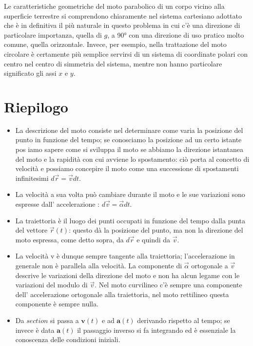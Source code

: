 \documentclass[class=book, crop=false, oneside, 12pt]{standalone}
\begin{document}
Le caratteristiche geometriche del moto parabolico di un corpo vicino alla superficie terrestre si comprendono chiaramente nel sistema cartesiano adottato che è in definitiva il più naturale in questo problema in cui c'è una direzione di particolare importanza, 
quella di \(g\), a 90° con una direzione di uso pratico molto comune, quella orizzontale. 
Invece, per esempio, nella trattazione del moto circolare è certamente più semplice servirsi di un sistema di coordinate polari con centro nel centro di simmetria del sistema, mentre non hanno particolare significato gli assi \(x\) e \(y\).

\section{Riepilogo}

\begin{itemize}
  \item La descrizione del moto consiste nel determinare come varia la posizione del punto in funzione del tempo; se conosciamo la posizione ad un certo istante pos iamo sapere come si sviluppa il moto se abbiamo la direzione istantanea del moto e la rapidità con cui avviene lo spostamento: ciò porta al concetto di velocità e possiamo concepire il moto come una successione di spostamenti infinitesimi \(d \overrightarrow{r}= \overrightarrow{v} dt\).
  \item La velocità a sua volta può cambiare durante il moto e le sue variazioni sono espresse dall' accelerazione : \(d \overrightarrow{v} = \overrightarrow{\alpha} d t\).
  \item La traiettoria è il luogo dei punti occupati in funzione del tempo dalla punta del vettore \(\overrightarrow{r}(t)\): questo dà la posizione del punto, ma non la direzione del moto espressa, come detto sopra, da \(d \overrightarrow{r}\) e quindi da \(\overrightarrow{v}\). 
  \item La velocità v è dunque sempre tangente alla traiettoria; l'accelerazione in generale non è parallela alla velocità. La componente di \(\overrightarrow{\alpha}\) ortogonale a \(\overrightarrow{v}\) descrive le variazioni della direzione del moto e non ha alcun legame con le variazioni del modulo di \(\overrightarrow{v}\). Nel moto curvilineo c'è sempre una componente dell' accelerazione ortogonale alla traiettoria, nel moto rettilineo questa componente è sempre nulla. 
  \item Da \(section\) si passa a \(\boldsymbol{v}(t)\) e ad \(\boldsymbol{a}(t)\) derivando rispetto al tempo; se invece è data \(\boldsymbol{a}(t)\) il passaggio inverso si fa integrando ed è essenziale la conoscenza delle condizioni iniziali. 

\end{itemize}
\end{document}
